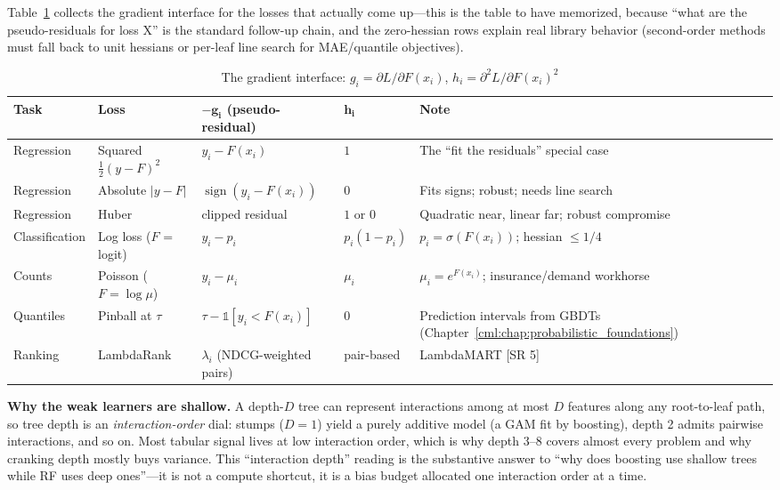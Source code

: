 Table~\ref{cml:tab:boosting_losses} collects the gradient interface for the losses that actually come up---this is the table to have memorized, because ``what are the pseudo-residuals for loss X'' is the standard follow-up chain, and the zero-hessian rows explain real library behavior (second-order methods must fall back to unit hessians or per-leaf line search for MAE/quantile objectives).

\begin{table}[H]
\centering
\small
\caption{The gradient interface: $g_i = \partial L / \partial F(x_i)$, $h_i = \partial^2 L / \partial F(x_i)^2$}
\label{cml:tab:boosting_losses}
\begin{tabularx}{\textwidth}{llllX}
\toprule
\textbf{Task} & \textbf{Loss} & $\bm{-g_i}$ \textbf{(pseudo-residual)} & $\bm{h_i}$ & \textbf{Note} \\
\midrule
Regression & Squared $\tfrac{1}{2}(y-F)^2$ & $y_i - F(x_i)$ & $1$ & The ``fit the residuals'' special case \\
Regression & Absolute $|y-F|$ & $\operatorname{sign}(y_i - F(x_i))$ & $0$ & Fits signs; robust; needs line search \\
Regression & Huber & clipped residual & $1$ or $0$ & Quadratic near, linear far; robust compromise \\
Classification & Log loss ($F$ = logit) & $y_i - p_i$ & $p_i(1-p_i)$ & $p_i = \sigma(F(x_i))$; hessian $\le 1/4$ \\
Counts & Poisson ($F = \log\mu$) & $y_i - \mu_i$ & $\mu_i$ & $\mu_i = e^{F(x_i)}$; insurance/demand workhorse \\
Quantiles & Pinball at $\tau$ & $\tau - \mathds{1}[y_i < F(x_i)]$ & $0$ & Prediction intervals from GBDTs (Chapter~\ref{cml:chap:probabilistic_foundations}) \\
Ranking & LambdaRank & $\lambda_i$ (NDCG-weighted pairs) & pair-based & LambdaMART [SR 5] \\
\bottomrule
\end{tabularx}
\end{table}

\textbf{Why the weak learners are shallow.} A depth-$D$ tree can represent interactions among at most $D$ features along any root-to-leaf path, so tree depth is an \textit{interaction-order} dial: stumps ($D=1$) yield a purely additive model (a GAM fit by boosting), depth 2 admits pairwise interactions, and so on. Most tabular signal lives at low interaction order, which is why depth 3--8 covers almost every problem and why cranking depth mostly buys variance. This ``interaction depth'' reading is the substantive answer to ``why does boosting use shallow trees while RF uses deep ones''---it is not a compute shortcut, it is a bias budget allocated one interaction order at a time.

